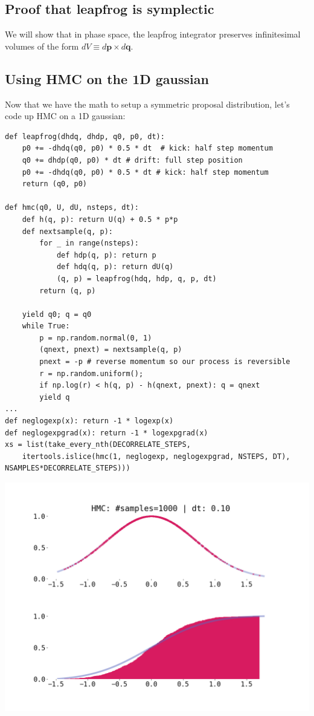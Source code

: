 \documentclass[titlepage]{article}
\newcommand{\p}{\mathbf{p}}
\newcommand{\q}{\mathbf{q}}
\begin{document}
\subsection{Proof that leapfrog is symplectic}

We will show that in phase space, the leapfrog integrator preserves infinitesimal
volumes of the form $dV \equiv d\p \times d\q$.


\subsection{Using HMC on the 1D gaussian}

Now that we have the math to setup a symmetric proposal distribution, let's
code up HMC on a 1D gaussian:

{\footnotesize

\begin{verbatim}
def leapfrog(dhdq, dhdp, q0, p0, dt):
    p0 += -dhdq(q0, p0) * 0.5 * dt  # kick: half step momentum
    q0 += dhdp(q0, p0) * dt # drift: full step position
    p0 += -dhdq(q0, p0) * 0.5 * dt # kick: half step momentum
    return (q0, p0)

def hmc(q0, U, dU, nsteps, dt):
    def h(q, p): return U(q) + 0.5 * p*p
    def nextsample(q, p):
        for _ in range(nsteps):
            def hdp(q, p): return p
            def hdq(q, p): return dU(q)
            (q, p) = leapfrog(hdq, hdp, q, p, dt)
        return (q, p)

    yield q0; q = q0
    while True:
        p = np.random.normal(0, 1)
        (qnext, pnext) = nextsample(q, p)
        pnext = -p # reverse momentum so our process is reversible
        r = np.random.uniform(); 
        if np.log(r) < h(q, p) - h(qnext, pnext): q = qnext
        yield q
...
def neglogexp(x): return -1 * logexp(x)
def neglogexpgrad(x): return -1 * logexpgrad(x)
xs = list(take_every_nth(DECORRELATE_STEPS, 
    itertools.islice(hmc(1, neglogexp, neglogexpgrad, NSTEPS, DT), NSAMPLES*DECORRELATE_STEPS)))
\end{verbatim}
}

\includegraphics[width=\textwidth]{mcmc-hmc-1d-exp.png}
\end{document}

